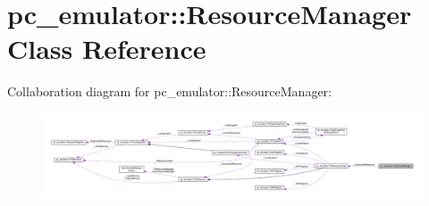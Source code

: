 \hypertarget{classpc__emulator_1_1ResourceManager}{}\section{pc\+\_\+emulator\+:\+:Resource\+Manager Class Reference}
\label{classpc__emulator_1_1ResourceManager}


Collaboration diagram for pc\+\_\+emulator\+:\+:Resource\+Manager\+:\nopagebreak
\begin{figure}[H]
\begin{center}
\leavevmode
\includegraphics[width=350pt]{classpc__emulator_1_1ResourceManager__coll__graph}
\end{center}
\end{figure}
